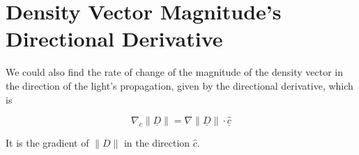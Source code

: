 
\section{Density Vector Magnitude's Directional Derivative}\label{sect: Norm of the Gradient of the Density Vector Magnitude}

We could also find the rate of change of the magnitude of the density vector in the direction of the light's propagation, given by the directional derivative, which is

\begin{equation}
	\nabla_c \| \underline{D} \| = \nabla \| \underline{D} \| \cdot \hat{\underline{c}}
\end{equation}

It is the gradient of $\|D\|$ in the direction $\hat{c}$.






